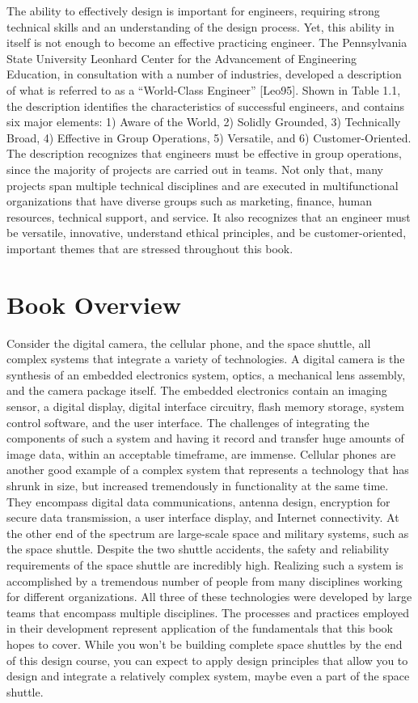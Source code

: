 \documentclass[a4paper,10pt]{book}
\begin{document}
The ability to effectively design is important for engineers, requiring
strong technical skills and an understanding of the design process. Yet,
this ability in itself is not enough to become an effective practicing
engineer. The Pennsylvania State University Leonhard Center for the
Advancement of Engineering Education, in consultation with a number of
industries, developed a description of what is referred to as a
``World-Class Engineer'' {[}Leo95{]}. Shown in Table 1.1, the
description identifies the characteristics of successful engineers, and
contains six major elements: 1) Aware of the World, 2) Solidly Grounded,
3) Technically Broad, 4) Effective in Group Operations, 5) Versatile,
and 6) Customer-Oriented. The description recognizes that engineers must
be effective in group operations, since the majority of projects are
carried out in teams. Not only that, many projects span multiple
technical disciplines and are executed in multifunctional organizations
that have diverse groups such as marketing, finance, human resources,
technical support, and service. It also recognizes that an engineer must
be versatile, innovative, understand ethical principles, and be
customer-oriented, important themes that are stressed throughout this
book.

\section{Book Overview}\label{book-overview}

Consider the digital camera, the cellular phone, and the space shuttle,
all complex systems that integrate a variety of technologies. A digital
camera is the synthesis of an embedded electronics system, optics, a
mechanical lens assembly, and the camera package itself. The embedded
electronics contain an imaging sensor, a digital display, digital
interface circuitry, flash memory storage, system control software, and
the user interface. The challenges of integrating the components of such
a system and having it record and transfer huge amounts of image data,
within an acceptable timeframe, are immense. Cellular phones are another
good example of a complex system that represents a technology that has
shrunk in size, but increased tremendously in functionality at the same
time. They encompass digital data communications, antenna design,
encryption for secure data transmission, a user interface display, and
Internet connectivity. At the other end of the spectrum are large-scale
space and military systems, such as the space shuttle. Despite the two
shuttle accidents, the safety and reliability requirements of the space
shuttle are incredibly high. Realizing such a system is accomplished by
a tremendous number of people from many disciplines working for
different organizations. All three of these technologies were developed
by large teams that encompass multiple disciplines. The processes and
practices employed in their development represent application of the
fundamentals that this book hopes to cover. While you won't be building
complete space shuttles by the end of this design course, you can expect
to apply design principles that allow you to design and integrate a
relatively complex system, maybe even a part of the space shuttle.
\end{document}
